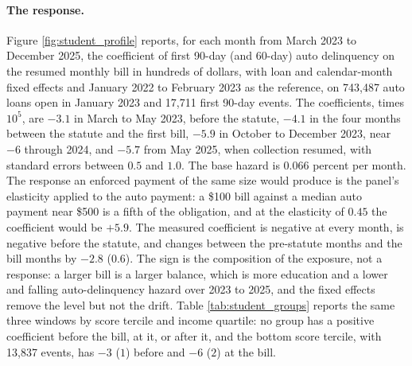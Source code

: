 \paragraph{The response.} Figure \ref{fig:student_profile} reports, for each month from March 2023 to December 2025, the coefficient of first 90-day (and 60-day) auto delinquency on the resumed monthly bill in hundreds of dollars, with loan and calendar-month fixed effects and January 2022 to February 2023 as the reference, on 743,487 auto loans open in January 2023 and 17,711 first 90-day events. The coefficients, times $10^{5}$, are $-3.1$ in March to May 2023, before the statute, $-4.1$ in the four months between the statute and the first bill, $-5.9$ in October to December 2023, near $-6$ through 2024, and $-5.7$ from May 2025, when collection resumed, with standard errors between $0.5$ and $1.0$. The base hazard is $0.066$ percent per month. The response an enforced payment of the same size would produce is the panel's elasticity applied to the auto payment: a \$100 bill against a median auto payment near \$500 is a fifth of the obligation, and at the elasticity of $0.45$ the coefficient would be $+5.9$. The measured coefficient is negative at every month, is negative before the statute, and changes between the pre-statute months and the bill months by $-2.8$ ($0.6$). The sign is the composition of the exposure, not a response: a larger bill is a larger balance, which is more education and a lower and falling auto-delinquency hazard over 2023 to 2025, and the fixed effects remove the level but not the drift. Table \ref{tab:student_groups} reports the same three windows by score tercile and income quartile: no group has a positive coefficient before the bill, at it, or after it, and the bottom score tercile, with 13,837 events, has $-3$ ($1$) before and $-6$ ($2$) at the bill.

